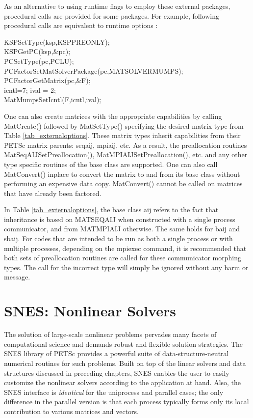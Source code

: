 As an alternative to using runtime flags to employ these external
packages, 
procedural calls are provided for some packages. For example, following procedural calls
are equivalent to runtime options
   :
\begin{tabbing}
KSPSetType(ksp,KSPPREONLY);\\
KSPGetPC(ksp,\&pc);\\
PCSetType(pc,PCLU);\\
PCFactorSetMatSolverPackage(pc,MATSOLVERMUMPS);\\
PCFactorGetMatrix(pc,\&F);\\
icntl=7; ival = 2;\\
MatMumpsSetIcntl(F,icntl,ival);
\end{tabbing}

One can also create matrices with the appropriate
capabilities by calling MatCreate() followed by MatSetType()
specifying the desired matrix type from Table \ref{tab_externaloptions}.
These matrix types inherit capabilities from their PETSc matrix
parents: seqaij, mpiaij, etc.  As a result, the preallocation routines
MatSeqAIJSetPreallocation(), MatMPIAIJSetPreallocation(), etc. and any other type
specific routines of the base class are supported.  One can also
call MatConvert() inplace to convert the matrix to and from its base
class without performing an expensive data copy.  MatConvert() cannot be
called on matrices that have already been factored.

In Table \ref{tab_externaloptions}, the base class aij refers to the fact
that inheritance is based on MATSEQAIJ when constructed with a single
process communicator, and from MATMPIAIJ otherwise.  The same holds
for baij and sbaij.  For codes that are intended to be run as both a
single process or with multiple processes, depending on the mpiexec
command, it is recommended that both sets of preallocation routines
are called for these communicator morphing types.  The call for the
incorrect type will simply be ignored without any harm or message.


\cleardoublepage
\chapter{SNES: Nonlinear Solvers}
\label{chapter_snes}

The solution of large-scale nonlinear problems pervades many facets of
computational science and demands robust and flexible solution
strategies. The SNES library of PETSc provides a powerful suite of
data-structure-neutral numerical routines for such problems.  Built on
top of the linear solvers and data structures discussed in preceding
chapters, SNES enables the user to easily customize the nonlinear
solvers according to the application at hand.  Also, the SNES
interface is {\em identical} for the uniprocess and parallel cases;
the only difference in the parallel version is that each process
typically forms only its local contribution to various matrices and
vectors.

